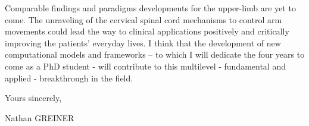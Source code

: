 \documentclass[a4paper,oneside,12pt]{article}
\begin{document}
Comparable findings and paradigms developments for the upper-limb are yet to come. The unraveling of the cervical spinal cord mechanisms to control arm movements could lead the way to clinical applications positively and critically improving the patients’ everyday lives.
I think that the development of new computational models and frameworks – to which I will dedicate the four years to come as a PhD student - will contribute to this multilevel - fundamental and applied - breakthrough in the field. \\


\vspace{2mm}

Yours sincerely, 

\begin{flushright}
Nathan GREINER
\end{flushright}
\end{document}
